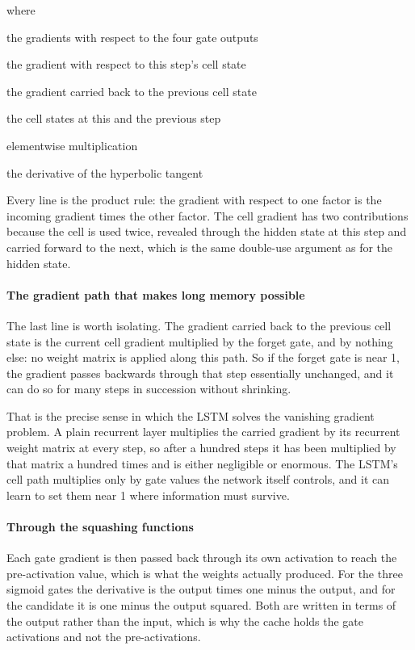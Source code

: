 \noindent where
\begin{description}[leftmargin=2.4em,style=nextline,font=\normalfont\ttfamily]\setlength\itemsep{1pt}
  \item[{$\mathrm{d}o,\,\mathrm{d}f,\,\mathrm{d}i,\,\mathrm{d}g$}] \normalfont the gradients with respect to the four gate outputs
  \item[{$\mathrm{d}c$}] \normalfont the gradient with respect to this step's cell state
  \item[{$\mathrm{d}c_{t-1}$}] \normalfont the gradient carried back to the previous cell state
  \item[{$c_t,\,c_{t-1}$}] \normalfont the cell states at this and the previous step
  \item[{$\odot$}] \normalfont elementwise multiplication
  \item[{$1-\tanh^2$}] \normalfont the derivative of the hyperbolic tangent
\end{description}
Every line is the product rule: the gradient with respect to one factor is the incoming gradient times the other factor. The cell gradient has two contributions because the cell is used twice, revealed through the hidden state at this step and carried forward to the next, which is the same double-use argument as for the hidden state.


\paragraph{The gradient path that makes long memory possible}
The last line is worth isolating. The gradient carried back to the previous cell state is the current cell gradient multiplied by the forget gate, and by nothing else: no weight matrix is applied along this path. So if the forget gate is near 1, the gradient passes backwards through that step essentially unchanged, and it can do so for many steps in succession without shrinking.

That is the precise sense in which the LSTM solves the vanishing gradient problem. A plain recurrent layer multiplies the carried gradient by its recurrent weight matrix at every step, so after a hundred steps it has been multiplied by that matrix a hundred times and is either negligible or enormous. The LSTM's cell path multiplies only by gate values the network itself controls, and it can learn to set them near 1 where information must survive.


\paragraph{Through the squashing functions}
Each gate gradient is then passed back through its own activation to reach the pre-activation value, which is what the weights actually produced. For the three sigmoid gates the derivative is the output times one minus the output, and for the candidate it is one minus the output squared. Both are written in terms of the output rather than the input, which is why the cache holds the gate activations and not the pre-activations.



